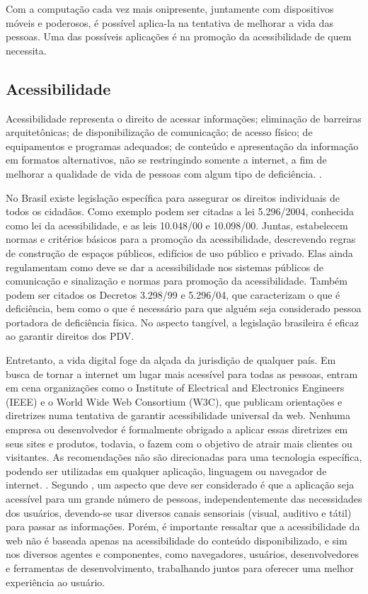 \documentclass[twoside,english,brazilian]{UNISINOSartigo}
\begin{document}
Com a computação cada vez mais onipresente, juntamente com dispositivos móveis e poderosos, é possível aplica-la na tentativa de melhorar a vida das pessoas. Uma das possíveis aplicações é na promoção da acessibilidade de quem necessita. 

\subsection{Acessibilidade}
Acessibilidade representa o direito de acessar informações; eliminação de barreiras arquitetônicas; de disponibilização de comunicação; de acesso físico; de equipamentos e programas adequados; de conteúdo e apresentação da informação em formatos alternativos, não se restringindo somente a internet, a fim de melhorar a qualidade de vida de pessoas com algum tipo de deficiência. \cite{AcessibilidadeBrasil}. 

No Brasil existe legislação específica para assegurar os direitos individuais de todos os cidadãos. Como exemplo podem ser citadas a lei 5.296/2004, conhecida como lei da acessibilidade, e as leis 10.048/00 e 10.098/00. Juntas, estabelecem normas e critérios básicos para a promoção da acessibilidade, descrevendo regras de construção de espaços públicos, edifícios de uso público e privado. Elas ainda regulamentam como deve se dar a acessibilidade nos sistemas públicos de comunicação e sinalização e normas para promoção da acessibilidade. Também podem ser citados os Decretos 3.298/99 e 5.296/04, que caracterizam o que é deficiência, bem como o que é necessário para que alguém seja considerado pessoa portadora de deficiência física. No aspecto tangível, a legislação brasileira é eficaz ao garantir direitos dos PDV.

Entretanto, a vida digital foge da alçada da jurisdição de qualquer país. Em busca de tornar a internet um lugar mais acessível para todas as pessoas, entram em cena organizações como o Institute of Electrical and Electronics Engineers (IEEE) e o World Wide Web Consortium (W3C), que publicam orientações e diretrizes numa tentativa de garantir acessibilidade universal da web. Nenhuma empresa ou desenvolvedor é formalmente obrigado a aplicar essas diretrizes em seus sites e produtos, todavia, o fazem com o objetivo de atrair mais clientes ou visitantes. As recomendações não são direcionadas para uma tecnologia específica, podendo ser utilizadas em qualquer aplicação, linguagem ou navegador de internet. \cite{W3Cguideliness}. Segundo , um aspecto que deve ser considerado é que a aplicação seja acessível para um grande número de pessoas, independentemente das necessidades dos usuários, devendo-se usar diversos canais sensoriais (visual, auditivo e tátil) para passar as informações. Porém, é importante ressaltar que a acessibilidade da web não é baseada apenas na acessibilidade do conteúdo disponibilizado, e sim nos diversos agentes e componentes, como navegadores, usuários, desenvolvedores e ferramentas de desenvolvimento, trabalhando juntos para oferecer uma melhor experiência ao usuário.
\end{document}
